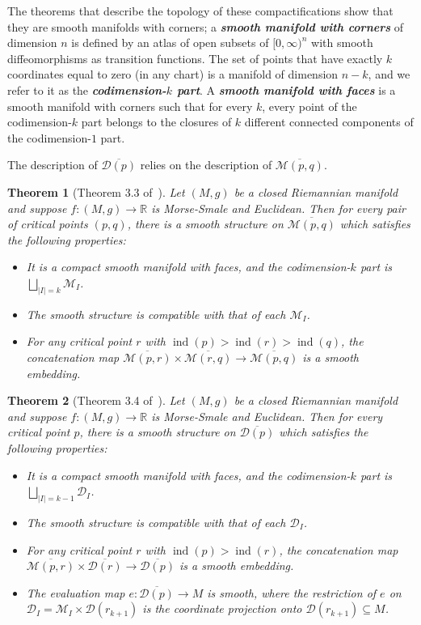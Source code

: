\documentclass[psamsfonts]{amsart}
\newtheorem{theorem}{Theorem}
\theoremstyle{remark}
\newcommand{\abs}[1]{\left\lvert #1 \right\rvert}
\DeclareMathOperator{\ind}{ind}
\begin{document}
The theorems that describe the topology of these compactifications show that they are smooth manifolds with corners; a \textbf{\emph{smooth manifold with corners}} of dimension $n$ is defined by an atlas of open subsets of $[0, \infty)^n$ with smooth diffeomorphisms as transition functions.  The set of points that have exactly $k$ coordinates equal to zero (in any chart) is a manifold of dimension $n-k$, and we refer to it as the \textbf{\emph{codimension-$k$ part}}.  A \textbf{\emph{smooth manifold with faces}} is a smooth manifold with corners such that for every $k$, every point of the codimension-$k$ part belongs to the closures of $k$ different connected components of the codimension-$1$ part.

The description of $\overline{\mathcal{D}(p)}$ relies on the description of $\overline{\mathcal{M}(p, q)}$.

\begin{theorem}[Theorem 3.3 of~\cite{Qin10}]\label{3.3}
Let $(M, g)$ be a closed Riemannian manifold and suppose $f : (M, g) \rightarrow \mathbb{R}$ is Morse-Smale and Euclidean.  Then for every pair of critical points $(p, q)$, there is a smooth structure on $\overline{\mathcal{M}(p, q)}$ which satisfies the following properties:
\begin{itemize}
\item It is a compact smooth manifold with faces, and the codimension-$k$ part is $\bigsqcup_{\abs{I} = k}\mathcal{M}_I$.
\item The smooth structure is compatible with that of each $\mathcal{M}_I$.
\item For any critical point $r$ with $\ind(p) > \ind(r) > \ind(q)$, the concatenation map $\overline{\mathcal{M}(p, r)} \times \overline{\mathcal{M}(r, q)} \rightarrow \overline{\mathcal{M}(p, q)}$ is a smooth embedding.
\end{itemize}
\end{theorem}

\begin{theorem}[Theorem 3.4 of~\cite{Qin10}]\label{3.4}
Let $(M, g)$ be a closed Riemannian manifold and suppose $f : (M, g) \rightarrow \mathbb{R}$ is Morse-Smale and Euclidean.  Then for every critical point $p$, there is a smooth structure on $\overline{\mathcal{D}(p)}$ which satisfies the following properties:
\begin{itemize}
\item It is a compact smooth manifold with faces, and the codimension-$k$ part is $\bigsqcup_{\abs{I} = k-1}\mathcal{D}_I$.
\item The smooth structure is compatible with that of each $\mathcal{D}_I$.
\item For any critical point $r$ with $\ind(p) > \ind(r)$, the concatenation map $\overline{\mathcal{M}(p, r)} \times \overline{\mathcal{D}(r)} \rightarrow \overline{\mathcal{D}(p)}$ is a smooth embedding.
\item The evaluation map $e : \overline{\mathcal{D}(p)} \rightarrow M$ is smooth, where the restriction of $e$ on $\mathcal{D}_I = \mathcal{M}_I \times \mathcal{D}(r_{k+1})$ is the coordinate projection onto $\mathcal{D}(r_{k+1}) \subseteq M$.
\end{itemize}
\end{theorem}
\end{document}
